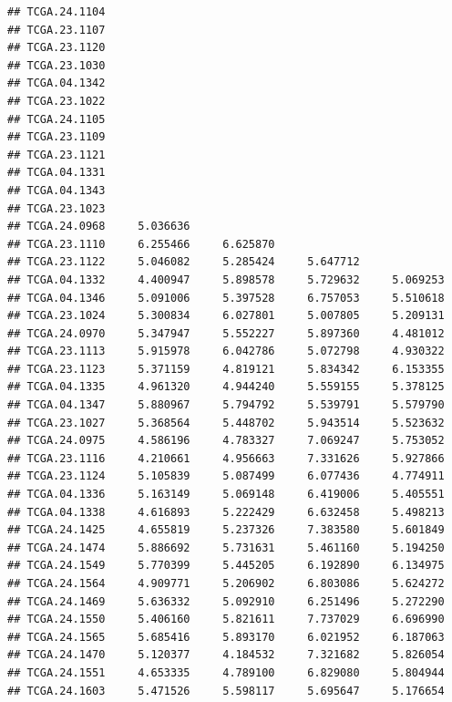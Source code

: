 \documentclass[UTF8]{beamer}\usepackage[]{graphicx}\usepackage[]{color}
\makeatletter
\newenvironment{kframe}{%
 \def\at@end@of@kframe{}%
 \ifinner\ifhmode%
  \def\at@end@of@kframe{\end{minipage}}%
  \begin{minipage}{\columnwidth}%
 \fi\fi%
 \def\FrameCommand##1{\hskip\@totalleftmargin \hskip-\fboxsep
 \colorbox{shadecolor}{##1}\hskip-\fboxsep
     \hskip-\linewidth \hskip-\@totalleftmargin \hskip\columnwidth}%
 \MakeFramed {\advance\hsize-\width
   \@totalleftmargin\z@ \linewidth\hsize
   \@setminipage}}%
 {\par\unskip\endMakeFramed%
 \at@end@of@kframe}
\newenvironment{knitrout}{}{} %
\makeatother
\begin{document}
\begin{frame}[fragile]
\begin{knitrout}
\begin{kframe}
\begin{verbatim}
## TCGA.24.1104                                                    
## TCGA.23.1107                                                    
## TCGA.23.1120                                                    
## TCGA.23.1030                                                    
## TCGA.04.1342                                                    
## TCGA.23.1022                                                    
## TCGA.24.1105                                                    
## TCGA.23.1109                                                    
## TCGA.23.1121                                                    
## TCGA.04.1331                                                    
## TCGA.04.1343                                                    
## TCGA.23.1023                                                    
## TCGA.24.0968     5.036636                                       
## TCGA.23.1110     6.255466     6.625870                          
## TCGA.23.1122     5.046082     5.285424     5.647712             
## TCGA.04.1332     4.400947     5.898578     5.729632     5.069253
## TCGA.04.1346     5.091006     5.397528     6.757053     5.510618
## TCGA.23.1024     5.300834     6.027801     5.007805     5.209131
## TCGA.24.0970     5.347947     5.552227     5.897360     4.481012
## TCGA.23.1113     5.915978     6.042786     5.072798     4.930322
## TCGA.23.1123     5.371159     4.819121     5.834342     6.153355
## TCGA.04.1335     4.961320     4.944240     5.559155     5.378125
## TCGA.04.1347     5.880967     5.794792     5.539791     5.579790
## TCGA.23.1027     5.368564     5.448702     5.943514     5.523632
## TCGA.24.0975     4.586196     4.783327     7.069247     5.753052
## TCGA.23.1116     4.210661     4.956663     7.331626     5.927866
## TCGA.23.1124     5.105839     5.087499     6.077436     4.774911
## TCGA.04.1336     5.163149     5.069148     6.419006     5.405551
## TCGA.04.1338     4.616893     5.222429     6.632458     5.498213
## TCGA.24.1425     4.655819     5.237326     7.383580     5.601849
## TCGA.24.1474     5.886692     5.731631     5.461160     5.194250
## TCGA.24.1549     5.770399     5.445205     6.192890     6.134975
## TCGA.24.1564     4.909771     5.206902     6.803086     5.624272
## TCGA.24.1469     5.636332     5.092910     6.251496     5.272290
## TCGA.24.1550     5.406160     5.821611     7.737029     6.696990
## TCGA.24.1565     5.685416     5.893170     6.021952     6.187063
## TCGA.24.1470     5.120377     4.184532     7.321682     5.826054
## TCGA.24.1551     4.653335     4.789100     6.829080     5.804944
## TCGA.24.1603     5.471526     5.598117     5.695647     5.176654

\end{verbatim}
\end{kframe}
\end{knitrout}
\end{frame}
\end{document}
